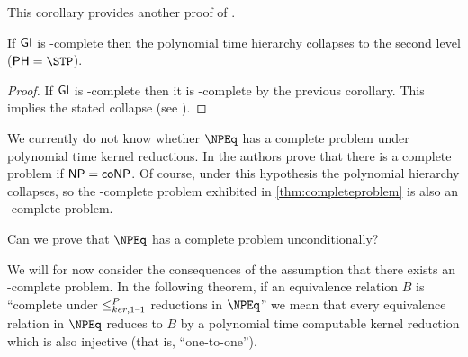This corollary provides another proof of \cite[Proposition~8.1]{bcffm}.

\begin{proposition}
  If ${\mathsf{GI}}$ is \NPEq-complete then the polynomial time hierarchy collapses to the second level ($\PH=\STP$).
\end{proposition}
\begin{proof}
  If ${\mathsf{GI}}$ is \NPEq-complete then it is \NP-complete by the previous corollary.
  This implies the stated collapse (see \cite{schoning87}).
\end{proof}

We currently do not know whether $\NPEq$ has a complete problem under polynomial time kernel reductions.
In \cite{bcffm} the authors prove that there is a complete problem if ${\mathsf{NP}}={\mathsf{coNP}}$.
Of course, under this hypothesis the polynomial hierarchy collapses, so the \NPcoNPEq-complete problem exhibited in \autoref{thm:completeproblem} is also an \NPEq-complete problem.
\begin{openproblem}
  Can we prove that $\NPEq$ has a complete problem unconditionally?
\end{openproblem}

We will for now consider the consequences of the assumption that there exists an \NPEq-complete problem.
In the following theorem, if an equivalence relation $B$ is ``complete under $\leq^{P}_{ker,1\text{--}1}$ reductions in $\NPEq$'' we mean that every equivalence relation in $\NPEq$ reduces to $B$ by a polynomial time computable kernel reduction which is also injective (that is, ``one-to-one'').

